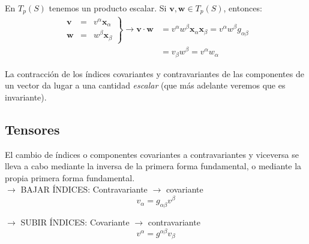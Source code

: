 En $T_p(S)$ tenemos un producto escalar. Si $\mathbf{v},\mathbf{w}\in T_p(S)$, entonces:
\begin{equation*}
    \begin{split}
        \left . \begin{array}{ccc}
             \mathbf{v}&=&v^\alpha \mathbf{x}_\alpha   \\
             \mathbf{w}&=&w^\beta \mathbf{x}_\beta  
        \end{array} \right \} \longrightarrow \mathbf{v}\cdot \mathbf{w}&=v^\alpha w^\beta \mathbf{x}_\alpha \mathbf{x}_\beta =v^\alpha w^\beta g_{\alpha \beta}\\
        &=v_\beta w^\beta =v^\alpha w_\alpha 
    \end{split}
\end{equation*}

La contracción de los índices covariantes y contravariantes de las componentes de un vector da lugar a una cantidad \emph{escalar} (que más adelante veremos que es invariante).

\subsection{Tensores}
El cambio de índices o componentes covariantes a contravariantes y viceversa se lleva a cabo mediante la inversa de la primera forma fundamental, o mediante la propia primera forma fundamental. \\

$\rightarrow $ BAJAR ÍNDICES: Contravariante $\to $ covariante\\
$$
v_\alpha =g_{\alpha \beta }v^\beta
$$

$\rightarrow $ SUBIR ÍNDICES: Covariante $\to $ contravariante\\
$$
v^\alpha =g^{\alpha \beta} v_\beta 
$$

